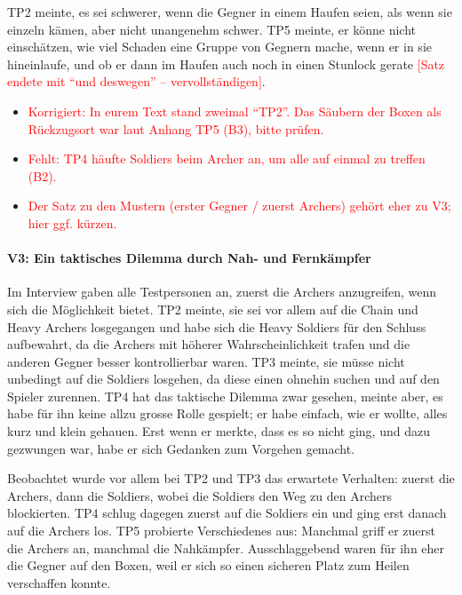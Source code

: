 \documentclass[../Main.tex]{subfiles}
\begin{document}
TP2 meinte, es sei schwerer, wenn die Gegner in einem Haufen seien, als wenn sie einzeln kämen, aber nicht unangenehm schwer. TP5 meinte, er könne nicht einschätzen, wie viel Schaden eine Gruppe von Gegnern mache, wenn er in sie hineinlaufe, und ob er dann im Haufen auch noch in einen Stunlock gerate \textcolor{red}{[Satz endete mit \enquote{und deswegen} -- vervollständigen]}.

\begin{itemize}[leftmargin=1.5cm]
    \item \textcolor{red}{Korrigiert: In eurem Text stand zweimal \enquote{TP2}. Das Säubern der Boxen als Rückzugsort war laut Anhang TP5 (B3), bitte prüfen.}
    \item \textcolor{red}{Fehlt: TP4 häufte Soldiers beim Archer an, um alle auf einmal zu treffen (B2).}
    \item \textcolor{red}{Der Satz zu den Mustern (erster Gegner / zuerst Archers) gehört eher zu V3; hier ggf. kürzen.}
\end{itemize}

\paragraph{V3: Ein taktisches Dilemma durch Nah- und Fernkämpfer}
Im Interview gaben alle Testpersonen an, zuerst die Archers anzugreifen, wenn sich die Möglichkeit bietet. TP2 meinte, sie sei vor allem auf die Chain und Heavy Archers losgegangen und habe sich die Heavy Soldiers für den Schluss aufbewahrt, da die Archers mit höherer Wahrscheinlichkeit trafen und die anderen Gegner besser kontrollierbar waren. TP3 meinte, sie müsse nicht unbedingt auf die Soldiers losgehen, da diese einen ohnehin suchen und auf den Spieler zurennen. TP4 hat das taktische Dilemma zwar gesehen, meinte aber, es habe für ihn keine allzu grosse Rolle gespielt; er habe einfach, wie er wollte, alles kurz und klein gehauen. Erst wenn er merkte, dass es so nicht ging, und dazu gezwungen war, habe er sich Gedanken zum Vorgehen gemacht.

Beobachtet wurde vor allem bei TP2 und TP3 das erwartete Verhalten: zuerst die Archers, dann die Soldiers, wobei die Soldiers den Weg zu den Archers blockierten. TP4 schlug dagegen zuerst auf die Soldiers ein und ging erst danach auf die Archers los. TP5 probierte Verschiedenes aus: Manchmal griff er zuerst die Archers an, manchmal die Nahkämpfer. Ausschlaggebend waren für ihn eher die Gegner auf den Boxen, weil er sich so einen sicheren Platz zum Heilen verschaffen konnte.
\end{document}
